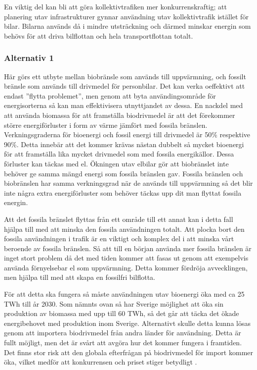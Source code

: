 \documentclass[a4paper,11pt,fleqn, titlepage]{article}
\begin{document}
En viktig del kan bli att göra kollektivtrafiken mer konkurrenskraftig; att planering utav infrastrukturer gynnar användning utav kollektivtrafik istället för bilar. Bilarna används då i mindre utsträckning och därmed minskar energin som behövs för att driva bilflottan och hela transportflottan totalt.

\subsubsection{Alternativ 1}
Här görs ett utbyte mellan biobränsle som används till uppvärmning, och
fossilt bränsle som används till drivmedel för personbilar. Det kan verka
oeffektivt att endast ''flytta problemet'', men genom att byta
användingsområde för energisorterna så kan man effektivisera utnyttjandet
av dessa. En nackdel med att använda biomassa för att framställa
biodrivmedel är att det förekommer större energiförluster i form av värme
jämfört med fossila bränslen. Verkningsgraderna för bioenergi och fossil
energi till drivmedel är 50\% respektive 90\%. Detta innebär att det kommer
krävas nästan dubbelt så mycket bioenergi för att framställa lika mycket
drivmedel som med fossila energikällor. Dessa förluster kan täckas med el.
Ökningen utav elbilar gör att biobränslet inte behöver ge samma mängd
energi som fossila bränslen gav. Fossila bränslen och biobränslen har samma
verkningsgrad när de används till uppvärmning så det blir inte några extra
energiförluster som behöver täckas upp dit man flyttat fossila energin.

Att det fossila bränslet flyttas från ett område till ett annat kan i detta fall hjälpa till med att minska den fossila användningen totalt. Att plocka bort den fossila användningen i trafik är en viktigt och komplex del i att minska vårt beroende av fossila bränslen. Så att till en början använda mer fossila bränslen är inget stort problem då det med tiden kommer att fasas ut genom att exempelvis använda förnyelsebar el som uppvärmning. Detta kommer fördröja avvecklingen, men hjälpa till med att skapa en fossilfri bilflotta.

För att detta ska fungera så måste användningen utav bioenergi öka med ca
25 TWh till år 2030. Som nämnts ovan så har Sverige möjlighet att öka sin produktion
av biomassa med upp till 60 TWh, så det går att täcka det ökade
energibehovet med produktion inom Sverige. Alternativt skulle detta kunna
lösas genom att importera biodrivmedel från andra länder för användning.
Detta är fullt möjligt, men det är svårt att avgöra hur det kommer fungera
i framtiden. Det finns stor risk att den globala efterfrågan på
biodrivmedel för import kommer öka, vilket medför att konkurrensen och
priset stiger betydligt \cite{fossilfrihet}.
\end{document}
